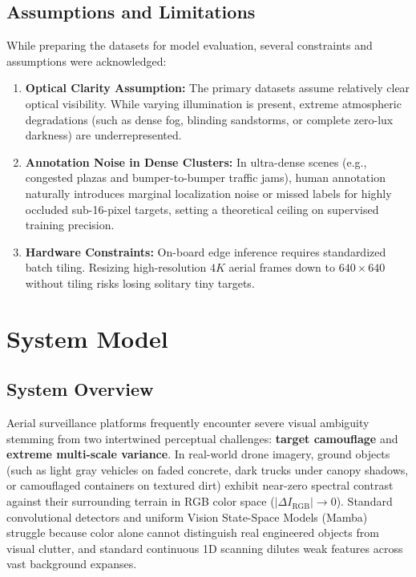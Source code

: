 \documentclass[12pt,a4paper]{report}
\begin{document}
\section{Assumptions and Limitations}
While preparing the datasets for model evaluation, several constraints and assumptions were acknowledged:
\begin{enumerate}[leftmargin=2em]
    \item \textbf{Optical Clarity Assumption:} The primary datasets assume relatively clear optical visibility. While varying illumination is present, extreme atmospheric degradations (such as dense fog, blinding sandstorms, or complete zero-lux darkness) are underrepresented.
    \item \textbf{Annotation Noise in Dense Clusters:} In ultra-dense scenes (e.g., congested plazas and bumper-to-bumper traffic jams), human annotation naturally introduces marginal localization noise or missed labels for highly occluded sub-16-pixel targets, setting a theoretical ceiling on supervised training precision.
    \item \textbf{Hardware Constraints:} On-board edge inference requires standardized batch tiling. Resizing high-resolution $4K$ aerial frames down to $640 \times 640$ without tiling risks losing solitary tiny targets.
\end{enumerate}

\chapter{System Model}

\section{System Overview}
Aerial surveillance platforms frequently encounter severe visual ambiguity stemming from two intertwined perceptual challenges: \textbf{target camouflage} and \textbf{extreme multi-scale variance}. In real-world drone imagery, ground objects (such as light gray vehicles on faded concrete, dark trucks under canopy shadows, or camouflaged containers on textured dirt) exhibit near-zero spectral contrast against their surrounding terrain in RGB color space ($|\Delta I_{\text{RGB}}| \to 0$). Standard convolutional detectors and uniform Vision State-Space Models (Mamba)~\cite{gu2023mamba,liu2024vmamba} struggle because color alone cannot distinguish real engineered objects from visual clutter, and standard continuous 1D scanning dilutes weak features across vast background expanses.
\end{document}
